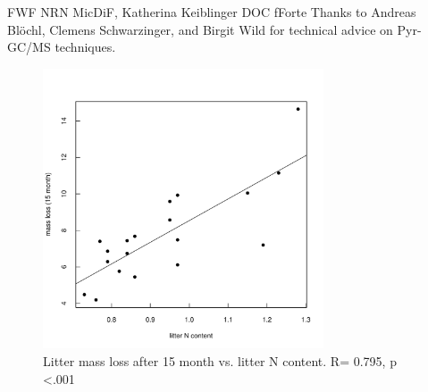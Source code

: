 \documentclass[journal abbreviation]{copernicus}
\begin{document}
\begin{acknowledgements}
FWF NRN MicDiF, Katherina Keiblinger DOC fForte
Thanks to Andreas Bl\"ochl, Clemens Schwarzinger, and Birgit Wild for technical advice on Pyr-GC/MS techniques.
\end{acknowledgements}















\begin{figure}[t]
\vspace*{2mm}
\begin{center}
\includegraphics[width=8.3cm]{massloss_n_lit.pdf}
\end{center}
\label{n_massloss}
\caption{Litter mass loss after 15 month vs. litter N content. R= 0.795, p \textless .001}
\end{figure}
\end{document}
